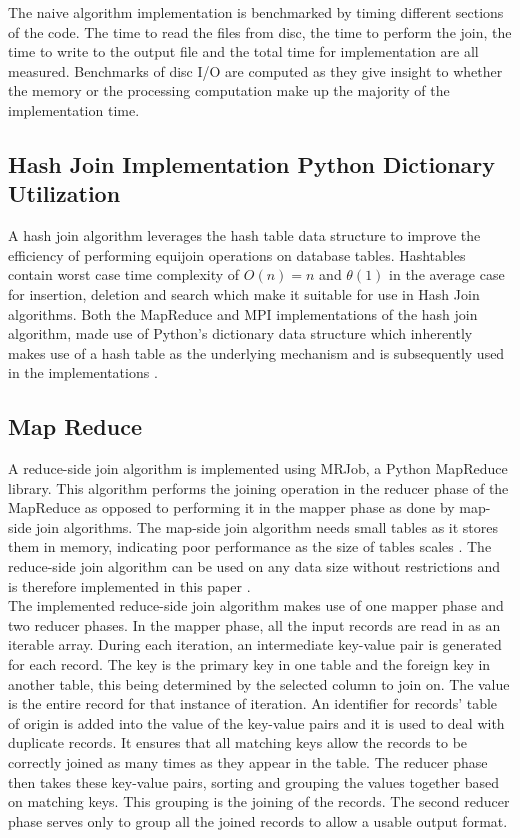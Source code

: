 \documentclass[10.5 pt, conference]{IEEEtran}
\begin{document}
The naive algorithm implementation is benchmarked by timing different sections of the code. The time to read the files from disc, the time to perform the join, the time to write to the output file and the total time for implementation are all measured. Benchmarks of disc I/O are computed as they give insight to whether the memory or the processing computation make up the majority of the implementation time.

\subsection{Hash Join Implementation Python Dictionary Utilization }
A hash join algorithm leverages the hash table data structure to improve the efficiency of performing equijoin operations on database tables. Hashtables contain worst case time complexity of $O(n) = n $ and $\theta(1)$ in the average case for insertion, deletion and search which make it suitable for use in Hash Join algorithms. Both the MapReduce and MPI implementations of the hash join algorithm, made use of Python’s dictionary data structure which inherently makes use of a hash table as the underlying mechanism and is subsequently used in the implementations \cite{TutorialsPoint2018}.

\subsection{Map Reduce}
A reduce-side join algorithm is implemented using MRJob, a Python MapReduce library. This algorithm performs the joining operation in the reducer phase of the MapReduce as opposed to performing it in the mapper phase as done by map-side join algorithms. The map-side join algorithm needs small tables as it stores them in memory, indicating poor performance as the size of tables scales \cite{Priyanka2013}. The reduce-side join algorithm can be used on any data size without restrictions and is therefore implemented in this paper \cite{Mohamed2015}.\\

The implemented reduce-side join algorithm makes use of one mapper phase and two reducer phases. In the mapper phase, all the input records are read in as an iterable array. During each iteration, an intermediate key-value pair is generated for each record. The key is the primary key in one table and the foreign key in another table, this being determined by the selected column to join on. The value is the entire record for that instance of iteration. An identifier for records’ table of origin is added into the value of the key-value pairs and it is used to deal with duplicate records. It ensures that all matching keys allow the records to be correctly joined as many times as they appear in the table. The reducer phase then takes these key-value pairs, sorting and grouping the values together based on matching keys. This grouping is the joining of the records. The second reducer phase serves only to group all the joined records to allow a usable output format.\\ 
\end{document}
